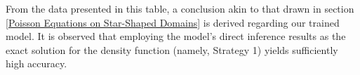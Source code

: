 \documentclass{article}
\begin{document}
From the data presented in this table, a conclusion akin to that drawn in section \ref{Poisson Equations on Star-Shaped Domains} is derived regarding our trained model. It is observed that employing the model's direct inference results as the exact solution for the density function (namely, Strategy 1) yields sufficiently high accuracy.



\end{document}
